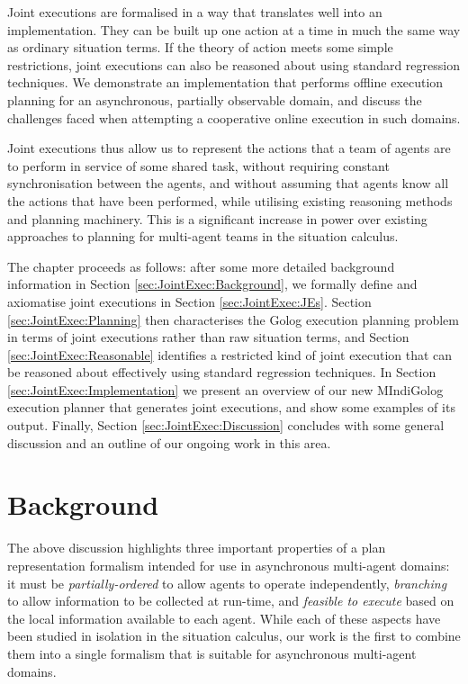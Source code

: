 Joint executions are formalised in a way that translates well into
an implementation. They can be built up one action at a time in much
the same way as ordinary situation terms. If the theory of action
meets some simple restrictions, joint executions can also be reasoned
about using standard regression techniques. We demonstrate an implementation
that performs offline execution planning for an asynchronous, partially
observable domain, and discuss the challenges faced when attempting
a cooperative online execution in such domains.

Joint executions thus allow us to represent the actions that a team
of agents are to perform in service of some shared task, without requiring
constant synchronisation between the agents, and without assuming
that agents know all the actions that have been performed, while utilising
existing reasoning methods and planning machinery. This is a significant
increase in power over existing approaches to planning for multi-agent
teams in the situation calculus.

The chapter proceeds as follows: after some more detailed background
information in Section \ref{sec:JointExec:Background}, we formally
define and axiomatise joint executions in Section \ref{sec:JointExec:JEs}.
Section \ref{sec:JointExec:Planning} then characterises the Golog
execution planning problem in terms of joint executions rather than
raw situation terms, and Section \ref{sec:JointExec:Reasonable} identifies
a restricted kind of joint execution that can be reasoned about effectively
using standard regression techniques. In Section \ref{sec:JointExec:Implementation}
we present an overview of our new MIndiGolog execution planner that
generates joint executions, and show some examples of its output.
Finally, Section \ref{sec:JointExec:Discussion} concludes with some
general discussion and an outline of our ongoing work in this area.


\section{Background\label{sec:JointExec:Background}}

The above discussion highlights three important properties of a plan
representation formalism intended for use in asynchronous multi-agent
domains: it must be \emph{partially-ordered} to allow agents to operate
independently, \emph{branching} to allow information to be collected
at run-time, and \emph{feasible to execute} based on the local information
available to each agent. While each of these aspects have been studied
in isolation in the situation calculus, our work is the first to combine
them into a single formalism that is suitable for asynchronous multi-agent
domains.


